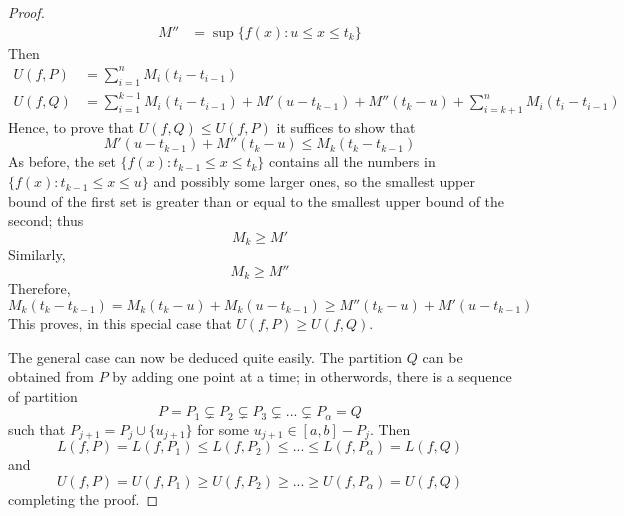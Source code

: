\documentclass[12pt, a4paper, oneside, openright, titlepage]{book}
\begin{document}
\begin{proof}
\begin{align*}
        M'' &= \sup\{f(x):u \leq x \leq t_k\}
    \end{align*}
    Then \begin{align*}
        U(f,P) &= \sum\limits_{i=1}^nM_i(t_i - t_{i-1}) \\
        U(f,Q) &= \sum\limits_{i=1}^{k-1}M_i(t_i - t_{i-1}) + M'(u-t_{k-1}) + M''(t_k-u) + \sum\limits_{i=k+1}^nM_i(t_i - t_{i-1})
    \end{align*}
    Hence, to prove that $U(f,Q) \leq U(f,P)$ it suffices to show that \begin{equation*}
        M'(u-t_{k-1}) + M''(t_k - u) \leq M_k(t_k-t_{k-1})
    \end{equation*}
    As before, the set $\{f(x):t_{k-1}\leq x \leq t_k\}$ contains all the numbers in $\{f(x):t_{k-1}\leq x \leq u\}$ and possibly some          larger ones, so the smallest upper bound of the first set is greater than or equal to the smallest upper bound of the second; thus          \begin{equation*}
        M_k \geq M'
    \end{equation*}
    Similarly, \begin{equation*}
        M_k \geq M''
    \end{equation*}
    Therefore, \begin{equation*}
        M_k(t_k-t_{k-1}) = M_k(t_k - u) + M_k(u-t_{k-1}) \geq M''(t_k-u) + M'(u-t_{k-1})
    \end{equation*}
    This proves, in this special case that $U(f,P) \geq U(f,Q)$.


    The general case can now be deduced quite easily. The partition $Q$ can be obtained from $P$ by adding one point at a time; in otherwords, there is a sequence of partition \begin{equation*}
        P = P_1\subsetneq P_2 \subsetneq P_3 \subsetneq ... \subsetneq P_{\alpha} = Q
    \end{equation*}
    such that $P_{j+1} = P_j\cup\{u_{j+1}\}$ for some $u_{j+1} \in [a,b]-P_j$. Then \begin{equation*}
        L(f,P) = L(f,P_1) \leq L(f,P_2) \leq ... \leq L(f,P_{\alpha}) = L(f,Q)
    \end{equation*}
    and \begin{equation*}
        U(f,P) = U(f,P_1) \geq U(f,P_2) \geq ... \geq U(f,P_{\alpha}) = U(f,Q)
    \end{equation*}
    completing the proof.
\end{proof}

\clearpage
\end{document}
